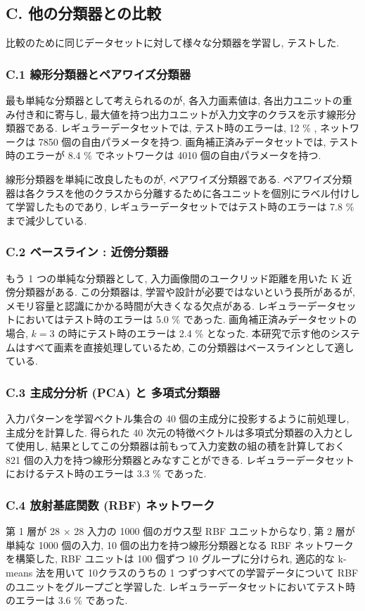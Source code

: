 \documentclass[twocolumn]{jarticle}     %
\begin{document}
\subsection{C. 他の分類器との比較}
比較のために同じデータセットに対して様々な分類器を学習し, テストした.

\subsubsection{C.1 線形分類器とペアワイズ分類器}
最も単純な分類器として考えられるのが, 各入力画素値は, 各出力ユニットの重み付き和に寄与し, 最大値を持つ出力ユニットが入力文字のクラスを示す線形分類器である.
レギュラーデータセットでは, テスト時のエラーは, 12 \% , ネットワークは 7850 個の自由パラメータを持つ. 画角補正済みデータセットでは, テスト時のエラーが 8.4 \% でネットワークは 4010 個の自由パラメータを持つ.
\par
線形分類器を単純に改良したものが, ペアワイズ分類器である. ペアワイズ分類器は各クラスを他のクラスから分離するために各ユニットを個別にラベル付けして学習したものであり, レギュラーデータセットではテスト時のエラーは 7.8 \% まで減少している.

\subsubsection{C.2 ベースライン : 近傍分類器}
もう 1 つの単純な分類器として, 入力画像間のユークリッド距離を用いた K 近傍分類器がある.
この分類器は, 学習や設計が必要ではないという長所があるが, メモリ容量と認識にかかる時間が大きくなる欠点がある.
レギュラーデータセットにおいてはテスト時のエラーは 5.0 \% であった. 画角補正済みデータセットの場合, $k = 3$ の時にテスト時のエラーは 2.4 \% となった.
本研究で示す他のシステムはすべて画素を直接処理しているため, この分類器はベースラインとして適している.

\subsubsection{C.3 主成分分析 (PCA) と 多項式分類器}
入力パターンを学習ベクトル集合の 40 個の主成分に投影するように前処理し, 主成分を計算した. 得られた 40 次元の特徴ベクトルは多項式分類器の入力として使用し, 結果としてこの分類器は前もって入力変数の組の積を計算しておく 821 個の入力を持つ線形分類器とみなすことができる.
レギュラーデータセットにおけるテスト時のエラーは 3.3 \% であった.

\subsubsection{C.4 放射基底関数 (RBF) ネットワーク}
第 1 層が 28 × 28 入力の 1000 個のガウス型 RBF ユニットからなり, 第 2 層が単純な 1000 個の入力, 10 個の出力を持つ線形分類器となる RBF ネットワークを構築した,
RBF ユニットは 100 個ずつ 10 グループに分けられ, 適応的な k-means 法を用いて 10クラスのうちの 1 つずつすべての学習データについて RBF のユニットをグループごと学習した.
レギュラーデータセットにおいてテスト時のエラーは 3.6 \% であった.
\end{document}
